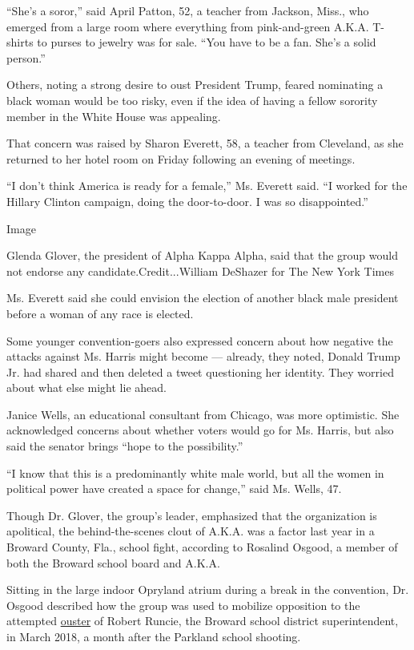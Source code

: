 ``She's a soror,'' said April Patton, 52, a teacher from Jackson, Miss.,
who emerged from a large room where everything from pink-and-green
A.K.A. T-shirts to purses to jewelry was for sale. ``You have to be a
fan. She's a solid person.''

Others, noting a strong desire to oust President Trump, feared
nominating a black woman would be too risky, even if the idea of having
a fellow sorority member in the White House was appealing.

That concern was raised by Sharon Everett, 58, a teacher from Cleveland,
as she returned to her hotel room on Friday following an evening of
meetings.

``I don't think America is ready for a female,'' Ms. Everett said. ``I
worked for the Hillary Clinton campaign, doing the door-to-door. I was
so disappointed.''

Image

Glenda Glover, the president of Alpha Kappa Alpha, said that the group
would not endorse any candidate.Credit...William DeShazer for The New
York Times

Ms. Everett said she could envision the election of another black male
president before a woman of any race is elected.

Some younger convention-goers also expressed concern about how negative
the attacks against Ms. Harris might become --- already, they noted,
Donald Trump Jr. had shared and then deleted a tweet questioning her
identity. They worried about what else might lie ahead.

Janice Wells, an educational consultant from Chicago, was more
optimistic. She acknowledged concerns about whether voters would go for
Ms. Harris, but also said the senator brings ``hope to the
possibility.''

``I know that this is a predominantly white male world, but all the
women in political power have created a space for change,'' said Ms.
Wells, 47.

Though Dr. Glover, the group's leader, emphasized that the organization
is apolitical, the behind-the-scenes clout of A.K.A. was a factor last
year in a Broward County, Fla., school fight, according to Rosalind
Osgood, a member of both the Broward school board and A.K.A.

Sitting in the large indoor Opryland atrium during a break in the
convention, Dr. Osgood described how the group was used to mobilize
opposition to the attempted
\href{https://www.sun-sentinel.com/news/education/fl-ne-runcie-school-board-vote-20190305-story.html}{ouster}
of Robert Runcie, the Broward school district superintendent, in March
2018, a month after the Parkland school shooting.

